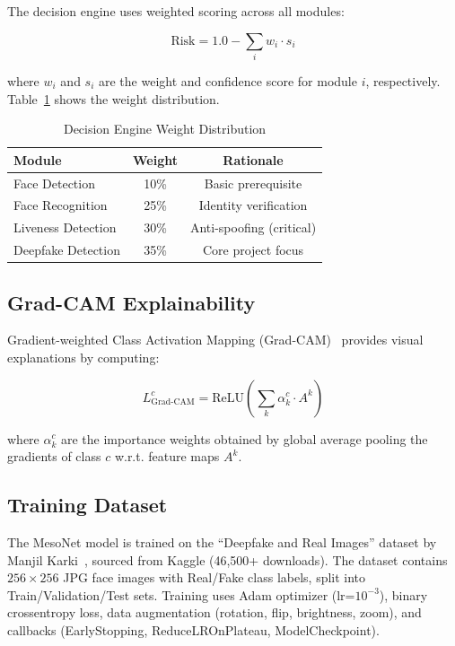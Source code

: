 \documentclass[conference,10pt]{IEEEtran}
\begin{document}
The decision engine uses weighted scoring across all modules:

\begin{equation}
    \text{Risk} = 1.0 - \sum_{i} w_i \cdot s_i
\end{equation}

where $w_i$ and $s_i$ are the weight and confidence score for module $i$, respectively. Table~\ref{tab:weights} shows the weight distribution.

\begin{table}[H]
\centering
\caption{Decision Engine Weight Distribution}
\label{tab:weights}
\begin{tabular}{lcc}
\toprule
\textbf{Module} & \textbf{Weight} & \textbf{Rationale} \\
\midrule
Face Detection & 10\% & Basic prerequisite \\
Face Recognition & 25\% & Identity verification \\
Liveness Detection & 30\% & Anti-spoofing (critical) \\
Deepfake Detection & 35\% & Core project focus \\
\bottomrule
\end{tabular}
\end{table}

\subsection{Grad-CAM Explainability}

Gradient-weighted Class Activation Mapping (Grad-CAM)~\cite{selvaraju2017} provides visual explanations by computing:

\begin{equation}
    L^c_{\text{Grad-CAM}} = \text{ReLU}\left(\sum_k \alpha^c_k \cdot A^k\right)
\end{equation}

where $\alpha^c_k$ are the importance weights obtained by global average pooling the gradients of class $c$ w.r.t. feature maps $A^k$.

\subsection{Training Dataset}

The MesoNet model is trained on the ``Deepfake and Real Images'' dataset by Manjil Karki~\cite{karki2022}, sourced from Kaggle (46,500+ downloads). The dataset contains $256 \times 256$ JPG face images with Real/Fake class labels, split into Train/Validation/Test sets. Training uses Adam optimizer (lr=$10^{-3}$), binary crossentropy loss, data augmentation (rotation, flip, brightness, zoom), and callbacks (EarlyStopping, ReduceLROnPlateau, ModelCheckpoint).
\end{document}
